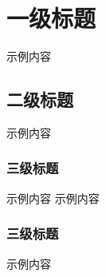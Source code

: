 \chapter{一级标题}
示例内容

\section{二级标题}
示例内容
\subsection{三级标题}
示例内容
示例内容\cite{10.1007/978-3-662-44848-9_34}

\subsection{三级标题}
示例内容



